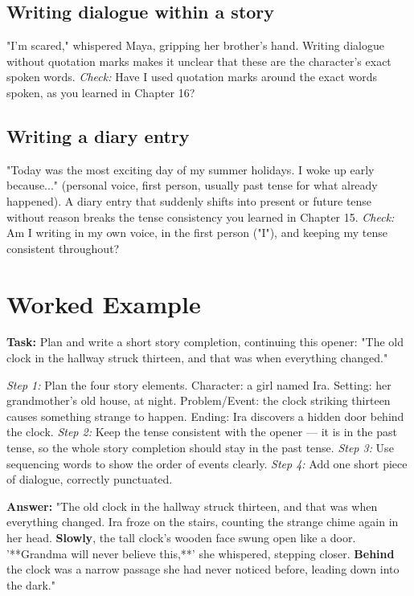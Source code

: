 \subsection*{Writing dialogue within a story}
"I'm scared," whispered Maya, gripping her brother's hand. Writing dialogue without quotation marks makes it unclear that these are the character's exact spoken words. \textit{Check:} Have I used quotation marks around the exact words spoken, as you learned in Chapter 16?

\subsection*{Writing a diary entry}
"Today was the most exciting day of my summer holidays. I woke up early because..." (personal voice, first person, usually past tense for what already happened). A diary entry that suddenly shifts into present or future tense without reason breaks the tense consistency you learned in Chapter 15. \textit{Check:} Am I writing in my own voice, in the first person ("I"), and keeping my tense consistent throughout?

\section{Worked Example}
\begin{examplebox}
\textbf{Task:} Plan and write a short story completion, continuing this opener: "The old clock in the hallway struck thirteen, and that was when everything changed."

\textit{Step 1:} Plan the four story elements. Character: a girl named Ira. Setting: her grandmother's old house, at night. Problem/Event: the clock striking thirteen causes something strange to happen. Ending: Ira discovers a hidden door behind the clock.
\textit{Step 2:} Keep the tense consistent with the opener — it is in the past tense, so the whole story completion should stay in the past tense.
\textit{Step 3:} Use sequencing words to show the order of events clearly.
\textit{Step 4:} Add one short piece of dialogue, correctly punctuated.

\textbf{Answer:} "The old clock in the hallway struck thirteen, and that was when everything changed. Ira froze on the stairs, counting the strange chime again in her head. \textbf{Slowly}, the tall clock's wooden face swung open like a door. '**Grandma will never believe this,**' she whispered, stepping closer. \textbf{Behind} the clock was a narrow passage she had never noticed before, leading down into the dark."
\end{examplebox}

